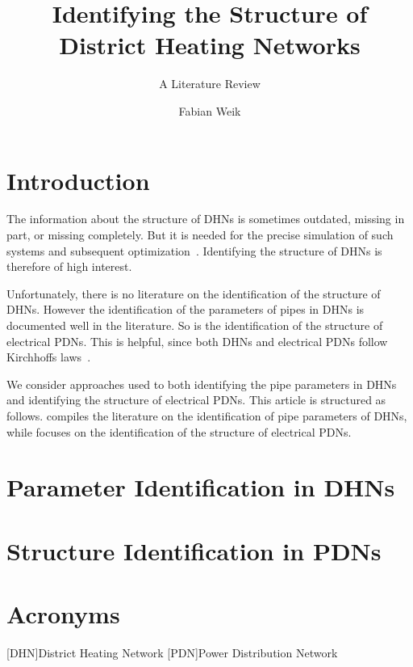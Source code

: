 \documentclass{scrartcl}
\title{Identifying the Structure of \\ District Heating Networks}
\subtitle{A Literature Review}
\author{Fabian Weik}
\begin{document}
    \maketitle

    \section{Introduction}

    The information about the structure of \acp{DHN} is sometimes outdated, missing in part, or missing completely.
    But it is needed for the precise simulation of such systems and subsequent optimization~\cite{adnetheat}.
    Identifying the structure of \acp{DHN} is therefore of high interest.

    Unfortunately, there is no literature on the identification of the structure of \acp{DHN}.
    However the identification of the parameters of pipes in \acp{DHN} is documented well in the literature.
    So is the identification of the structure of electrical \acp{PDN}.
    This is helpful, since both \acp{DHN} and electrical \acp{PDN} follow Kirchhoffs laws~\cite{Moser2016waterelectricitysimilarity}.

    We consider approaches used to both identifying the pipe parameters in \acp{DHN} and identifying the structure of electrical \acp{PDN}.
    This article is structured as follows.
     compiles the literature on the identification of pipe parameters of \acp{DHN}, while  focuses on the identification of the structure of electrical \acp{PDN}.

    \section{Parameter Identification in \acp{DHN}}
    \label{sec:parameter-identification}

    \section{Structure Identification in \acp{PDN}}
    \label{sec:structure-identification}

    \printbibliography

    \section{Acronyms}

    \begin{acronym}
        [DHN]{District Heating Network}
        [PDN]{Power Distribution Network}
    \end{acronym}
\end{document}
